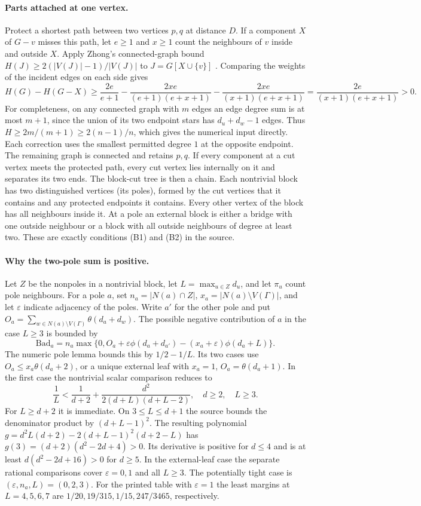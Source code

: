 \documentclass[11pt,a4paper]{article}
\newcommand{\Bad}{\mathrm{Bad}}
\begin{document}
\paragraph{Parts attached at one vertex.}
Protect a shortest path between two vertices $p,q$ at distance $D$. If a component $X$ of $G-v$ misses this path, let $e\ge1$ and $x\ge1$ count the neighbours of $v$ inside and outside $X$. Apply Zhong's connected-graph bound $H(J)\ge2(|V(J)|-1)/|V(J)|$ to $J=G[X\cup\{v\}]$ \cite{zhong}. Comparing the weights of the incident edges on each side gives
\[
 H(G)-H(G-X)\ge\frac{2e}{e+1}
 -\frac{2xe}{(e+1)(e+x+1)}-\frac{2xe}{(x+1)(e+x+1)}
 =\frac{2e}{(x+1)(e+x+1)}>0.
\]
For completeness, on any connected graph with $m$ edges an edge degree sum is at most $m+1$, since the union of its two endpoint stars has $d_u+d_w-1$ edges. Thus $H\ge2m/(m+1)\ge2(n-1)/n$, which gives the numerical input directly. Each correction uses the smallest permitted degree $1$ at the opposite endpoint. The remaining graph is connected and retains $p,q$. If every component at a cut vertex meets the protected path, every cut vertex lies internally on it and separates its two ends. The block-cut tree is then a chain. Each nontrivial block has two distinguished vertices (its poles), formed by the cut vertices that it contains and any protected endpoints it contains. Every other vertex of the block has all neighbours inside it. At a pole an external block is either a bridge with one outside neighbour or a block with all outside neighbours of degree at least two. These are exactly conditions (B1) and (B2) in the source.
\paragraph{Why the two-pole sum is positive.}
Let $Z$ be the nonpoles in a nontrivial block, let $L=\max_{u\in Z}d_u$, and let $\pi_u$ count pole neighbours. For a pole $a$, set $n_a=|N(a)\cap Z|$, $x_a=|N(a)\setminus V(\Gamma)|$, and let $\varepsilon$ indicate adjacency of the poles. Write $a'$ for the other pole and put $O_a=\sum_{w\in N(a)\setminus V(\Gamma)}\theta(d_a+d_w)$. The possible negative contribution of $a$ in the case $L\ge3$ is bounded by
\[
 \Bad_a=n_a\max\{0,O_a+\varepsilon\phi(d_a+d_{a'})-(x_a+\varepsilon)\phi(d_a+L)\}.
\]
The numeric pole lemma bounds this by $1/2-1/L$. Its two cases use $O_a\le x_a\theta(d_a+2)$, or a unique external leaf with $x_a=1$, $O_a=\theta(d_a+1)$. In the first case the nontrivial scalar comparison reduces to
\[
 \frac1L<\frac1{d+2}+\frac{d^2}{2(d+L)(d+L-2)},\quad d\ge2,\quad L\ge3.
\]
For $L\ge d+2$ it is immediate. On $3\le L\le d+1$ the source bounds the denominator product by $(d+L-1)^2$. The resulting polynomial $g=d^2L(d+2)-2(d+L-1)^2(d+2-L)$ has $g(3)=(d+2)(d^2-2d+4)>0$. Its derivative is positive for $d\le4$ and is at least $d(d^2-2d+16)>0$ for $d\ge5$. In the external-leaf case the separate rational comparisons cover $\varepsilon=0,1$ and all $L\ge3$. The potentially tight case is $(\varepsilon,n_a,L)=(0,2,3)$. For the printed table with $\varepsilon=1$ the least margins at $L=4,5,6,7$ are $1/20,19/315,1/15,247/3465$, respectively.
 
\end{document}
